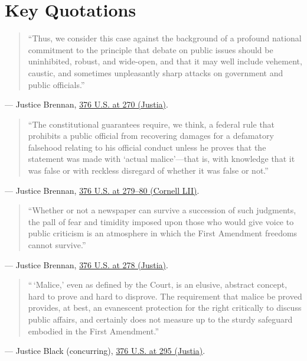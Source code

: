 \documentclass[12pt]{article}
\begin{document}
\section{Key Quotations}
\begin{quote}
``Thus, we consider this case against the background of a profound national commitment to the principle that debate on public issues should be uninhibited, robust, and wide-open, and that it may well include vehement, caustic, and sometimes unpleasantly sharp attacks on government and public officials.''
\end{quote}
\noindent --- Justice Brennan, \href{https://supreme.justia.com/cases/federal/us/376/254/}{376 U.S. at 270 (Justia)}.

\begin{quote}
``The constitutional guarantees require, we think, a federal rule that prohibits a public official from recovering damages for a defamatory falsehood relating to his official conduct unless he proves that the statement was made with `actual malice'---that is, with knowledge that it was false or with reckless disregard of whether it was false or not.''
\end{quote}
\noindent --- Justice Brennan, \href{https://www.law.cornell.edu/supremecourt/text/376/254}{376 U.S. at 279--80 (Cornell LII)}.

\begin{quote}
``Whether or not a newspaper can survive a succession of such judgments, the pall of fear and timidity imposed upon those who would give voice to public criticism is an atmosphere in which the First Amendment freedoms cannot survive.''
\end{quote}
\noindent --- Justice Brennan, \href{https://supreme.justia.com/cases/federal/us/376/254/}{376 U.S. at 278 (Justia)}.

\begin{quote}
``\,`Malice,' even as defined by the Court, is an elusive, abstract concept, hard to prove and hard to disprove. The requirement that malice be proved provides, at best, an evanescent protection for the right critically to discuss public affairs, and certainly does not measure up to the sturdy safeguard embodied in the First Amendment.''
\end{quote}
\noindent --- Justice Black (concurring), \href{https://supreme.justia.com/cases/federal/us/376/254/}{376 U.S. at 295 (Justia)}.
\end{document}
